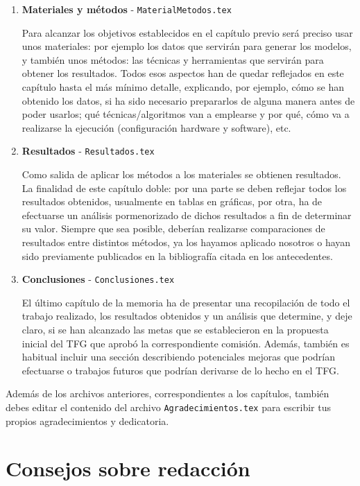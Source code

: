 \begin{enumerate}
    \item \textbf{Materiales y métodos} - \texttt{MaterialMetodos.tex} \par
    Para alcanzar los objetivos establecidos en el capítulo previo será preciso usar unos materiales: por ejemplo los datos que servirán para generar los modelos, y también unos métodos: las técnicas y herramientas que servirán para obtener los resultados. Todos esos aspectos han de quedar reflejados en este capítulo hasta el más mínimo detalle, explicando, por ejemplo, cómo se han obtenido los datos, si ha sido necesario prepararlos de alguna manera antes de poder usarlos; qué técnicas/algoritmos van a emplearse y por qué, cómo va a realizarse la ejecución (configuración hardware y software), etc.
    
    \item \textbf{Resultados} - \texttt{Resultados.tex} \par
    Como salida de aplicar los métodos a los materiales se obtienen resultados. La finalidad de este capítulo doble: por una parte se deben reflejar todos los resultados obtenidos, usualmente en tablas en gráficas, por otra, ha de efectuarse un análisis pormenorizado de dichos resultados a fin de determinar su valor. Siempre que sea posible, deberían realizarse comparaciones de resultados entre distintos métodos, ya los hayamos aplicado nosotros o hayan sido previamente publicados en la bibliografía citada en los antecedentes.
    
    \item \textbf{Conclusiones} - \texttt{Conclusiones.tex} \par
    El último capítulo de la memoria ha de presentar una recopilación de todo el trabajo realizado, los resultados obtenidos y un análisis que determine, y deje claro, si se han alcanzado las metas que se establecieron en la propuesta inicial del TFG que aprobó la correspondiente comisión. Además, también es habitual incluir una sección describiendo potenciales mejoras que podrían efectuarse o trabajos futuros que podrían derivarse de lo hecho en el TFG.
\end{enumerate}

Además de los archivos anteriores, correspondientes a los capítulos, también debes editar el contenido del archivo \texttt{Agradecimientos.tex} para escribir tus propios agradecimientos y dedicatoria.

\section{Consejos sobre redacción}

